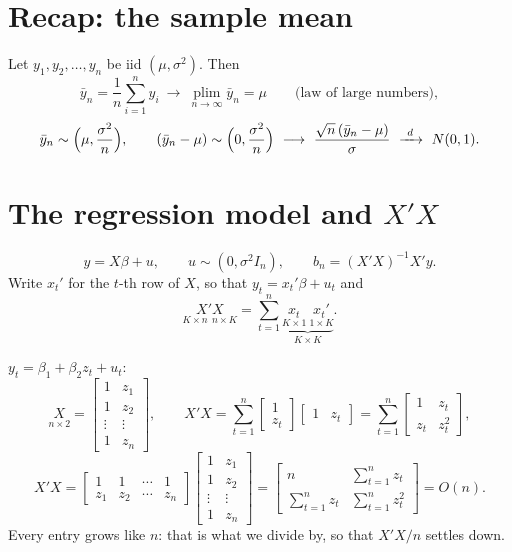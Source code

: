 \documentclass[11pt]{article}
\begin{document}

\section{Recap: the sample mean}

Let $y_{1}, y_{2}, \dots, y_{n}$ be iid $(\mu, \sigma^{2})$. Then
\[ \bar y_{n} = \frac{1}{n}\sum_{i=1}^{n} y_{i}
   \ \longrightarrow\ \operatorname*{plim}_{n\to\infty} \bar y_{n} = \mu
   \qquad \text{(law of large numbers)}, \]
\[ \bar y_{n} \sim \Bigl(\mu, \frac{\sigma^{2}}{n}\Bigr), \qquad
   (\bar y_{n} - \mu) \sim \Bigl(0, \frac{\sigma^{2}}{n}\Bigr)
   \ \longrightarrow\ \frac{\sqrt{n}\,(\bar y_{n} - \mu)}{\sigma} \ \xrightarrow{\ d\ }\ N(0, 1). \]


\section{The regression model and $X'X$}

\[ y = X\beta + u, \qquad u \sim (0, \sigma^{2}I_{n}), \qquad b_{n} = (X'X)^{-1}X'y. \]
Write $x_{t}'$ for the $t$-th row of $X$, so that $y_{t} = x_{t}'\beta + u_{t}$ and
\[ \underset{K\times n\ \ n\times K}{X'X}
   = \sum_{t=1}^{n} \underbrace{\underset{K\times 1}{x_{t}}\ \underset{1\times K}{x_{t}'}}_{K\times K}. \]

$y_{t} = \beta_{1} + \beta_{2}z_{t} + u_{t}$:
\[ \underset{n\times 2}{X} = \begin{bmatrix} 1 & z_{1}\\ 1 & z_{2}\\ \vdots & \vdots\\ 1 & z_{n} \end{bmatrix},
   \qquad
   X'X = \sum_{t=1}^{n} \begin{bmatrix} 1\\ z_{t} \end{bmatrix}\begin{bmatrix} 1 & z_{t} \end{bmatrix}
   = \sum_{t=1}^{n} \begin{bmatrix} 1 & z_{t}\\ z_{t} & z_{t}^{2} \end{bmatrix}, \]
\[ X'X = \begin{bmatrix} 1 & 1 & \cdots & 1\\ z_{1} & z_{2} & \cdots & z_{n} \end{bmatrix}
         \begin{bmatrix} 1 & z_{1}\\ 1 & z_{2}\\ \vdots & \vdots\\ 1 & z_{n} \end{bmatrix}
       = \begin{bmatrix} n & \sum_{t=1}^{n} z_{t}\\[2pt] \sum_{t=1}^{n} z_{t} & \sum_{t=1}^{n} z_{t}^{2} \end{bmatrix}
       = O(n). \]
Every entry grows like $n$: that is what we divide by, so that $X'X/n$ settles down.
\end{document}
